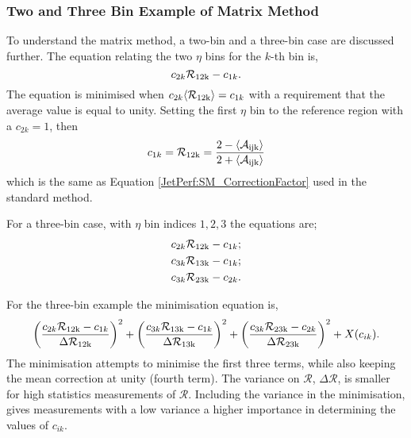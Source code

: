 \subsubsection{Two and Three Bin Example of Matrix Method}
To understand the matrix method, a two-bin and a three-bin case are discussed further.
The equation relating the two $\eta$ bins for the $k$-th \ptave{} bin is,  
\begin{equation}
c_{2k}\mathcal{R_{\rm 12k}}- c_{1k}.
\label{JetPerf:Matrix_2binEquations}
\end{equation}
The equation is minimised when $c_{2k}\mbox{$\langle \mathcal{R_{\rm 12k}} \rangle$}= c_{1k}$ with a requirement that the average value is equal to unity.
Setting the first $\eta$ bin to the reference region with a $c_{2k}=1$, then 
\begin{equation}
c_{1k}=\mathcal{R_{\rm 12k}}= \frac{2-\mbox{$\langle \mathcal{A_{\rm ijk}} \rangle$}}{2+\mbox{$\langle \mathcal{A_{\rm ijk}} \rangle$}} 
\label{JetPerf:Matrix_2binEquations}
\end{equation}
which is the same as Equation \ref{JetPerf:SM_CorrectionFactor} used in the standard method.


For a three-bin case, with $\eta$ bin indices ${1,2,3}$ the equations are;
\begin{equation}
\begin{split}
c_{2k}\mathcal{R_{\rm 12k}}- c_{1k}; \\
c_{3k}\mathcal{R_{\rm 13k}}- c_{1k}; \\
c_{3k}\mathcal{R_{\rm 23k}}- c_{2k}.
\end{split}
\label{JetPerf:Matrix_3binEquations}
\end{equation}

For the three-bin example the minimisation equation is,
\begin{equation}
\left(\frac{c_{2k}\mathcal{R_{\rm 12k}}- c_{1k}}{\Delta\mathcal{R_{\rm 12k}}}\right)^2+
\left(\frac{c_{3k}\mathcal{R_{\rm 13k}}- c_{1k}}{\Delta\mathcal{R_{\rm 13k}}}\right)^2+
\left(\frac{c_{3k}\mathcal{R_{\rm 23k}}- c_{2k}}{\Delta\mathcal{R_{\rm 23k}}}\right)^2+ X(c_{ik}).
\label{JetPerf:Matrix_3binEquations2}
\end{equation}
The minimisation attempts to minimise the first three terms, while also keeping the mean correction at unity (fourth term).
The variance on $\mathcal{R}$, $\Delta\mathcal{R}$, is smaller for high statistics measurements of $\mathcal{R}$.
Including the variance in the minimisation, gives measurements with a low variance a higher importance in determining the values of $c_{ik}$. 

